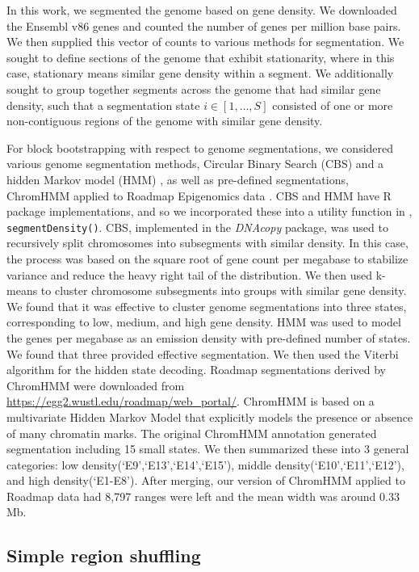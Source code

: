 \documentclass{article}
\begin{document}
In this work, we segmented the genome based on gene density. We
downloaded the Ensembl v86 genes \citep{ensemblTrimmedEntry} 
and counted the 
number of genes per million base pairs. We then supplied this vector
of counts to various methods for segmentation. We sought to define
sections of the genome that exhibit stationarity, where in this case,
stationary means similar gene density within a segment. We
additionally sought to group together segments across the genome that
had similar gene density, such that a segmentation state
$i \in [1,\dots,S]$ consisted of one or more non-contiguous regions of
the genome with similar gene density.

For block bootstrapping with respect to genome segmentations,
we considered various genome segmentation methods,
Circular Binary Search (CBS) \citep{cbs} and a hidden Markov model (HMM)
\citep{rcpphmm}, as well as pre-defined segmentations,
ChromHMM applied to 
Roadmap Epigenomics data \citep{ernst2012chromhmm}.
CBS and HMM
have R package implementations, and so we incorporated these
into a utility function in \nullranges, \texttt{segmentDensity()}.
CBS, implemented in the \textit{DNAcopy} package, was used to recursively split
chromosomes into subsegments with similar density. In this case, the
process was based on the square root of gene count per megabase to
stabilize variance and reduce the heavy right tail of the
distribution. We then used k-means to cluster
chromosome subsegments into groups with similar gene
density. We found that it was effective to cluster genome segmentations into
three states, corresponding to low, medium, and high gene
density. 
HMM was used to model the genes per megabase as an emission
density with pre-defined number of states. We found that three provided effective segmentation. 
We then used the Viterbi algorithm for the hidden state decoding. 
Roadmap segmentations derived by ChromHMM \citep{ernst2012chromhmm} were
downloaded from
\url{https://egg2.wustl.edu/roadmap/web_portal/}. ChromHMM is based on
a multivariate Hidden Markov Model that explicitly models the presence
or absence of many chromatin marks. The original ChromHMM annotation
generated segmentation including 
15 small states. We then summarized these into 3 general categories: low
density(`E9',`E13',`E14',`E15'), middle density(`E10',`E11',`E12'),
and high density(`E1-E8'). 
After merging, our version of ChromHMM applied to Roadmap data had
8,797 ranges were left and the mean width was around 
0.33 Mb.

\subsection{Simple region shuffling}\label{sec:shuffle}
\end{document}
